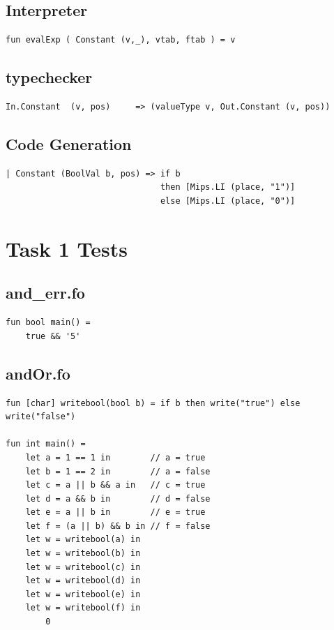 \documentclass[11pt]{article}
\begin{document}
    \subsection{Interpreter}
    \begin{lstlisting}[basicstyle=\small]
fun evalExp ( Constant (v,_), vtab, ftab ) = v
    \end{lstlisting}

    \subsection{typechecker}
    \begin{lstlisting}[basicstyle=\small]
In.Constant  (v, pos)     => (valueType v, Out.Constant (v, pos))
    \end{lstlisting}

    \subsection{Code Generation}
    \begin{lstlisting}[basicstyle=\small]
| Constant (BoolVal b, pos) => if b
                               then [Mips.LI (place, "1")]
                               else [Mips.LI (place, "0")]
    \end{lstlisting}

    \section{Task 1 Tests} \label{task_1_tests}
    \subsection{and\_err.fo}
    \begin{lstlisting}[basicstyle=\small]
fun bool main() =
    true && '5'
    \end{lstlisting}

    \subsection{andOr.fo}
    \begin{lstlisting}[basicstyle=\small]
fun [char] writebool(bool b) = if b then write("true") else write("false")

fun int main() =
    let a = 1 == 1 in        // a = true
    let b = 1 == 2 in        // a = false
    let c = a || b && a in   // c = true
    let d = a && b in        // d = false
    let e = a || b in        // e = true
    let f = (a || b) && b in // f = false
    let w = writebool(a) in
    let w = writebool(b) in
    let w = writebool(c) in
    let w = writebool(d) in
    let w = writebool(e) in
    let w = writebool(f) in
        0
    \end{lstlisting}
\end{document}
